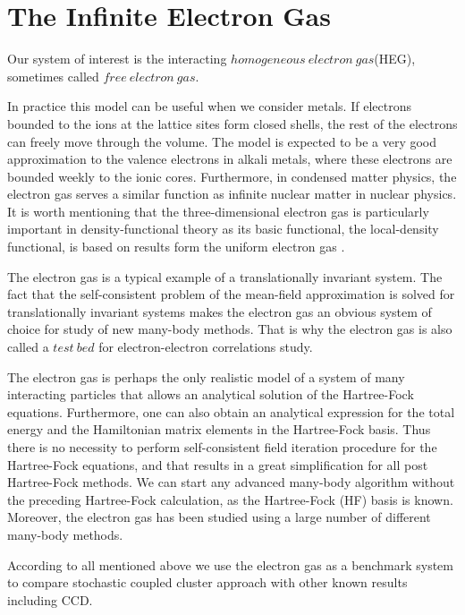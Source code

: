\documentclass[twoside,english]{uiofysmaster}
\begin{document}
\chapter{The Infinite Electron Gas}

Our system of interest is the interacting $homogeneous\ electron\ gas$(HEG), sometimes called $free\ electron\ gas$. 

In practice this model can be useful when we consider metals. If
electrons bounded to the ions at the lattice sites form closed shells,
the rest of the electrons can freely move through the volume. The
model is expected to be a very good approximation to the valence
electrons in alkali metals, where these electrons are bounded weekly
to the ionic cores\cite{GrossManyparticletheory1991}.  Furthermore, in
condensed matter physics, the electron gas serves a similar function as
infinite nuclear matter in nuclear
physics\cite{Hjorth-Jensenadvancedcoursecomputational2017}. It is worth
mentioning that the three-dimensional electron gas is particularly
important in density-functional theory as its basic functional, the
local-density functional, is based on results form the uniform electron
gas \cite{ShollDensityFunctionalTheory2009}.


The electron gas is a typical example of a translationally invariant
system. The fact that the self-consistent problem of the mean-field
approximation is solved for translationally invariant systems makes the
electron gas an obvious system of choice for study of new many-body
methods. That is why the electron gas is also called a $test\ bed$ for
electron-electron correlations study.


The electron gas is perhaps the only realistic model of a system of
many interacting particles that allows an analytical solution of the
Hartree-Fock equations. Furthermore, one can also obtain an analytical
expression for the total energy and the Hamiltonian matrix elements in
the Hartree-Fock basis. Thus there is no necessity to perform
self-consistent field iteration procedure for the Hartree-Fock
equations, and that results in a great simplification for all post
Hartree-Fock methods. We can start any advanced many-body algorithm
without the preceding Hartree-Fock calculation, as the Hartree-Fock (HF)  basis is known.
Moreover, the electron gas has been studied using a large number of
different many-body methods.

According to all mentioned above we use the electron gas as a
benchmark system to compare stochastic coupled cluster approach with
other known results including CCD.
\end{document}
